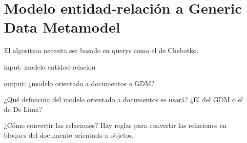 \section{Modelo entidad-relación a Generic Data Metamodel}


El algoritmo necesita ser basado en querys como el de Chebotko.


input: modelo entidad-relacion


output: ¿modelo orientado a documentos o GDM?


¿Qué definición del modelo orientado a documentos se usará? ¿El del GDM o el de De Lima?


¿Cómo convertir las relaciones?
Hay reglas para convertir las relaciones en bloques del documento orientado a objetos.

